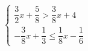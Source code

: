 $\begin{cases} \dfrac{3}{2}x+\dfrac{5}{8}>\dfrac{3}{8}x+4 \\[1ex] -\dfrac{3}{8}x+\dfrac{1}{3}\le \dfrac{1}{8}x-\dfrac{1}{6} \end{cases}$
